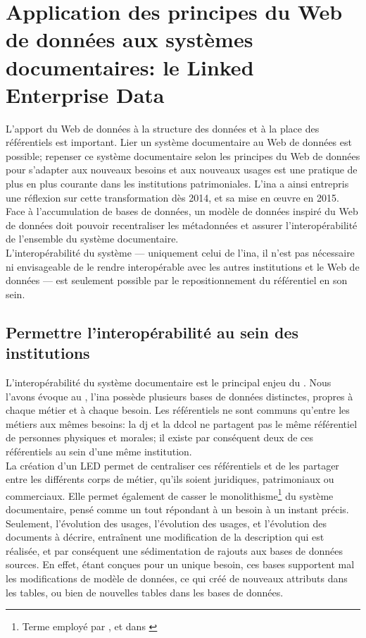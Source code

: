 \section{\label{III-B-1}Application des principes du Web de données aux systèmes documentaires: le Linked Enterprise Data}

L'apport du Web de données à la structure des données et à la place des référentiels est important. Lier un système documentaire au Web de données est possible; repenser ce système documentaire selon les principes du Web de données pour s'adapter aux nouveaux besoins et aux nouveaux usages est une pratique de plus en plus courante dans les institutions patrimoniales. L'\ac{ina} a ainsi entrepris une réflexion sur cette transformation dès 2014, et sa mise en œuvre en 2015. Face à l'accumulation de bases de données, un modèle de données inspiré du Web de données doit pouvoir recentraliser les métadonnées et assurer l'interopérabilité de l'ensemble du système documentaire.\\

L'interopérabilité du système --- uniquement celui de l'\ac{ina}, il n'est pas nécessaire ni envisageable de le rendre interopérable avec les autres institutions et le Web de données --- est seulement possible par le repositionnement du référentiel en son sein.

\subsection{\label{III-B-1-a}Permettre l'interopérabilité au sein des institutions}

L'interopérabilité du système documentaire est le principal enjeu du \ldd. Nous l'avons évoque au , l'\ac{ina} possède plusieurs bases de données distinctes, propres à chaque métier et à chaque besoin. Les référentiels ne sont communs qu'entre les métiers aux mêmes besoins: la \ac{dj} et la \ac{ddcol} ne partagent pas le même référentiel de personnes physiques et morales; il existe par conséquent deux de ces référentiels au sein d'une même institution.\\

La création d'un LED permet de centraliser ces référentiels et de les partager entre les différents corps de métier, qu'ils soient juridiques, patrimoniaux ou commerciaux. Elle permet également de casser le monolithisme\footnote{Terme employé par ,  et  dans \cite{bermes_cas_2013}} du système documentaire, pensé comme un tout répondant à un besoin à un instant précis. Seulement, l'évolution des usages, l'évolution des usages, et l'évolution des documents à décrire, entraînent une modification de la description qui est réalisée, et par conséquent une sédimentation de rajouts aux bases de données sources. En effet, étant conçues pour un unique besoin, ces bases supportent mal les modifications de modèle de données, ce qui créé de nouveaux attributs dans les tables, ou bien de nouvelles tables dans les bases de données.\\

